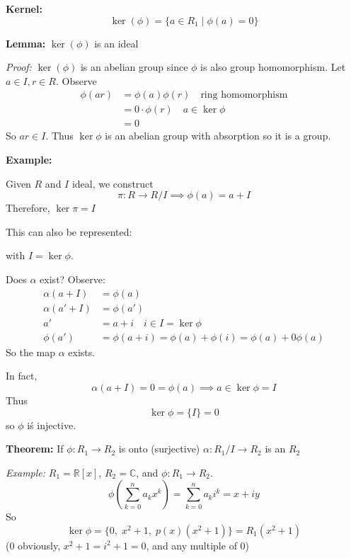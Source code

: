 \documentclass[12pt]{report}
\newcommand{\R}{\mathbb{R}}
\begin{document}
\textbf{Kernel:} 
\[\ker(\phi) = \{a \in R_1 \; | \; \phi(a) = 0\}\]

\vspace*{0.25in}
\textbf{Lemma:} $\ker(\phi)$ is an ideal

\emph{Proof:} $\ker(\phi)$ is an abelian group since $\phi$ is also group homomorphism. Let $a \in I, r \in R$. Observe
\begin{align*}
    \phi(ar) &= \phi(a)\phi(r) \quad \text{ring homomorphism}\\ 
    &= 0\cdot \phi(r) \quad a \in \ker\phi\\ 
    &= 0 
\end{align*}
So $ar \in I$. Thus $\ker\phi$ is an abelian group with absorption so it is a group. 

\textbf{Example:}

Given $R$ and $I$ ideal, we construct 
\[\pi: R \to R/I \implies \phi(a) = a + I\] 
Therefore, $\ker \pi = I$

This can also be represented:

\begin{center}
\end{center}

with $I = \ker \phi$.

Does $\alpha$ exist? Observe:
\begin{align*}
    \alpha(a + I) &= \phi(a)\\ 
    \alpha(a' + I) &= \phi(a')\\ 
    a' &= a + i \quad i \in I = \ker \phi\\ 
    \phi(a') &= \phi(a + i) = \phi(a) + \phi(i) = \phi(a) + 0 \phi(a)
\end{align*}
So the map $\alpha$ exists. 

In fact, 
\[\alpha(a + I) = 0 = \phi(a) \implies a \in \ker \phi = I\]
Thus 
\[\ker \phi = \{I\} = 0\]
so $\phi$ iś injective. 

\textbf{Theorem:} If $\phi: R_1 \to R_2$ is onto (surjective) $\alpha: R_1/I \to R_2$ is an $R_2$

\emph{Example:} $R_1 = \R[x]$, $R_2 = \mathbb{C}$, and $\phi: R_1 \to R_2$. 
\[\phi\left(\sum_{k=0}^n a_k x^k\right) = \sum_{k=0}^n a_k i^k = x + iy\]
So 
\[\ker \phi = \{0,\; x^2 + 1, \; p(x)(x^2 + 1)\} = R_1(x^2 + 1)\]
(0 obviously, $x^2 + 1 = i^2 + 1 = 0$, and any multiple of $0$)
\end{document}
